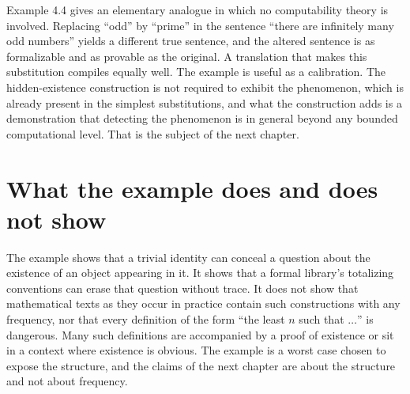 Example 4.4 gives an elementary analogue in which no computability theory is involved. Replacing ``odd'' by ``prime'' in the sentence ``there are infinitely many odd numbers'' yields a different true sentence, and the altered sentence is as formalizable and as provable as the original. A translation that makes this substitution compiles equally well. The example is useful as a calibration. The hidden-existence construction is not required to exhibit the phenomenon, which is already present in the simplest substitutions, and what the construction adds is a demonstration that detecting the phenomenon is in general beyond any bounded computational level. That is the subject of the next chapter.

\section{What the example does and does not show}

The example shows that a trivial identity can conceal a question about the existence of an object appearing in it. It shows that a formal library's totalizing conventions can erase that question without trace. It does not show that mathematical texts as they occur in practice contain such constructions with any frequency, nor that every definition of the form ``the least $n$ such that $\dots$'' is dangerous. Many such definitions are accompanied by a proof of existence or sit in a context where existence is obvious. The example is a worst case chosen to expose the structure, and the claims of the next chapter are about the structure and not about frequency.
